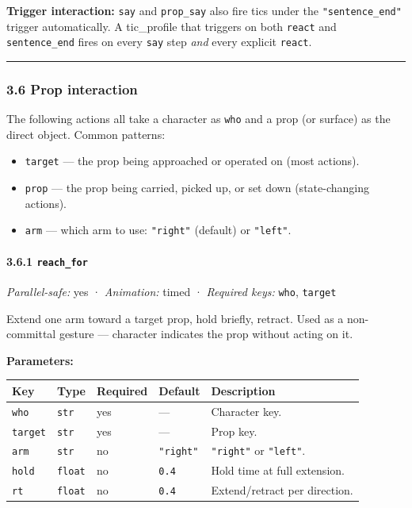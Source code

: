 \documentclass[
  11pt,
]{book}
\providecommand{\tightlist}{%
  \setlength{\itemsep}{0pt}\setlength{\parskip}{0pt}}
\begin{document}
\textbf{Trigger interaction:} \texttt{say} and \texttt{prop\_say} also
fire tics under the \texttt{"sentence\_end"} trigger automatically. A
tic\_profile that triggers on both \texttt{react} and
\texttt{sentence\_end} fires on every \texttt{say} step \emph{and} every
explicit \texttt{react}.

\begin{center}\rule{0.5\linewidth}{0.5pt}\end{center}

\subsubsection{3.6 Prop interaction}\label{prop-interaction}

The following actions all take a character as \texttt{who} and a prop
(or surface) as the direct object. Common patterns:

\begin{itemize}
\tightlist
\item
  \texttt{target} --- the prop being approached or operated on (most
  actions).
\item
  \texttt{prop} --- the prop being carried, picked up, or set down
  (state-changing actions).
\item
  \texttt{arm} --- which arm to use: \texttt{"right"} (default) or
  \texttt{"left"}.
\end{itemize}

\paragraph{\texorpdfstring{3.6.1
\texttt{reach\_for}}{3.6.1 reach\_for}}\label{reach_for}

\emph{Parallel-safe:} yes · \emph{Animation:} timed · \emph{Required
keys:} \texttt{who}, \texttt{target}

Extend one arm toward a target prop, hold briefly, retract. Used as a
non-committal gesture --- character indicates the prop without acting on
it.

\textbf{Parameters:}

\begin{longtable}[]{@{}lllll@{}}
\toprule\noalign{}
Key & Type & Required & Default & Description \\
\midrule\noalign{}
\endhead
\bottomrule\noalign{}
\endlastfoot
\texttt{who} & \texttt{str} & yes & --- & Character key. \\
\texttt{target} & \texttt{str} & yes & --- & Prop key. \\
\texttt{arm} & \texttt{str} & no & \texttt{"right"} & \texttt{"right"}
or \texttt{"left"}. \\
\texttt{hold} & \texttt{float} & no & \texttt{0.4} & Hold time at full
extension. \\
\texttt{rt} & \texttt{float} & no & \texttt{0.4} & Extend/retract per
direction. \\
\end{longtable}
\end{document}
